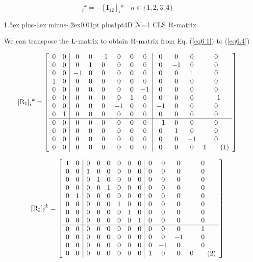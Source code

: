 \documentclass[12pt]{article}
\makeatletter
\newcommand\numberthis{\addtocounter{equation}{1}\tag{\theequation}}
\def\rL{{\rm L}}
\def\rR{{\rm R}}
\let\bm\relax
\newcommand{\bm}[1]{{\boldsymbol{#1}}}
\def\subsection{\@startsection{subsection}{2}{\z@}
         {1.5ex plus-1ex minus-.2ex}{0.01pt plus1pt}{\sf\slshape}}
\makeatother
\begin{document}
\begin{equation}
[{\bm{\rm W}}_n]_{i}{}^{k}=-[\mathbf{I}_{12}]_{i}{}^{k}\quad
n\in\{1,2,3,4\}
\end{equation}






\subsection{4D $\mathcal{N}$=1 CLS $\bm\rR$-matrix}

We can transpose the $\bm{\rL}$-matrix to obtain $\bm{\rR}$-matrix from Eq. (\ref{eq6.1}) to (\ref{eq6.4})

\[
[{\bm{\rm R}_1}]_{\hat i}{}^{k} = \left[\begin{array}{cc|cccccc|cccc}
 0 & 0 & 0 & 0 & -1 & 0 & 0 & 0 & 0 & 0 & 0 & 0 \\
 0 & 0 & 0 & 1 & 0 & 0 & 0 & 0 & 0 & -1 & 0 & 0 \\
 0 & 0 & -1 & 0 & 0 & 0 & 0 & 0 & 0 & 0 & 1 & 0 \\
 1 & 0 & 0 & 0 & 0 & 0 & 0 & 0 & 0 & 0 & 0 & 0 \\
 0 & 0 & 0 & 0 & 0 & 0 & 0 & -1 & 0 & 0 & 0 & 0 \\
 0 & 0 & 0 & 0 & 0 & 0 & 1 & 0 & 0 & 0 & 0 & -1 \\
 0 & 0 & 0 & 0 & 0 & -1 & 0 & 0 & -1 & 0 & 0 & 0 \\
 0 & 1 & 0 & 0 & 0 & 0 & 0 & 0 & 0 & 0 & 0 & 0 \\
\hline
 0 & 0 & 0 & 0 & 0 & 0 & 0 & 0 & -1 & 0 & 0 & 0 \\
 0 & 0 & 0 & 0 & 0 & 0 & 0 & 0 & 0 & 1 & 0 & 0 \\
 0 & 0 & 0 & 0 & 0 & 0 & 0 & 0 & 0 & 0 & -1 & 0 \\
 0 & 0 & 0 & 0 & 0 & 0 & 0 & 0 & 0 & 0 & 0 & 1  
\numberthis\end{array}\right] \]


\[
[{\bm{\rm R}_2}]_{\hat i}{}^{k} = \left[\begin{array}{cc|cccccc|cccc}
 1 & 0 & 0 & 0 & 0 & 0 & 0 & 0 & 0 & 0 & 0 & 0 \\
 0 & 0 & 1 & 0 & 0 & 0 & 0 & 0 & 0 & 0 & 0 & 0 \\
 0 & 0 & 0 & 1 & 0 & 0 & 0 & 0 & 0 & 0 & 0 & 0 \\
 0 & 0 & 0 & 0 & 1 & 0 & 0 & 0 & 0 & 0 & 0 & 0 \\
 0 & 1 & 0 & 0 & 0 & 0 & 0 & 0 & 0 & 0 & 0 & 0 \\
 0 & 0 & 0 & 0 & 0 & 1 & 0 & 0 & 0 & 0 & 0 & 0 \\
 0 & 0 & 0 & 0 & 0 & 0 & 1 & 0 & 0 & 0 & 0 & 0 \\
 0 & 0 & 0 & 0 & 0 & 0 & 0 & 1 & 0 & 0 & 0 & 0 \\
\hline
 0 & 0 & 0 & 0 & 0 & 0 & 0 & 0 & 0 & 0 & 0 & 1 \\
 0 & 0 & 0 & 0 & 0 & 0 & 0 & 0 & 0 & 0 & -1 & 0 \\
 0 & 0 & 0 & 0 & 0 & 0 & 0 & 0 & 0 & -1 & 0 & 0 \\
 0 & 0 & 0 & 0 & 0 & 0 & 0 & 0 & 1 & 0 & 0 & 0
\numberthis\end{array}\right] \]
\end{document}
